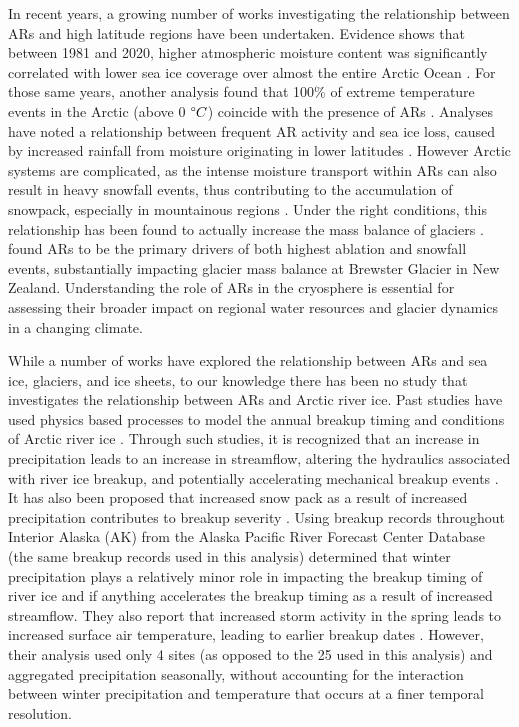 \documentclass[12pts,draft]{AR_analysis_}
\begin{document}
In recent years, a growing number of works 
investigating the relationship between ARs and 
high latitude regions have been undertaken. Evidence shows that between
1981 and 2020, higher atmospheric moisture content was significantly correlated
with lower sea ice coverage over almost the entire Arctic Ocean
\cite{ARs_lead_to_sea_ice_loss}. For those same years, another analysis
found that 100\% of extreme temperature events in the Arctic (above 0
$\degree C$) coincide with the presence of ARs \cite{Ma2023}. Analyses have noted
a relationship between frequent AR activity and sea ice loss, caused by
increased rainfall from moisture originating in lower latitudes
\cite{Zhang2023, maclennan_contribution_2022}. However Arctic systems
are complicated, as the intense moisture transport within ARs can also
result in heavy snowfall events, thus contributing to the accumulation
of snowpack, especially in mountainous regions \cite{Saavedra2020,
Guan2010}. Under the right conditions, this relationship has been found
to actually increase the mass balance of glaciers \cite{Little2019}.
\cite{Little2019} found ARs to be the primary drivers of both highest
ablation and snowfall events, substantially impacting glacier mass
balance at Brewster Glacier in New Zealand. 
Understanding the role of ARs in the cryosphere is essential for
assessing their broader impact on regional water resources and glacier
dynamics in a changing climate. 

While a number of works have explored
the relationship between ARs and sea ice, glaciers, and ice sheets, 
to our knowledge there has
been no study that investigates the relationship between ARs and Arctic
river ice. Past studies have used physics based processes
to model the annual breakup timing and conditions of Arctic river ice
\cite{Paily, ashton1986river, Prowse_Bonsal_Duguay_Lacroix_2007,
jasek1998, shen_newest}. Through such studies, it is recognized that an 
increase in precipitation leads to an increase in
streamflow, altering the hydraulics associated with river ice breakup, and 
potentially accelerating mechanical breakup events \cite{ashton1986river}.
It has also been proposed that increased snow pack as a result of increased 
precipitation contributes to breakup severity \cite{Prowes2002}. Using 
breakup records throughout Interior Alaska (AK) from the Alaska 
Pacific River Forecast Center Database
(the same breakup records used in this analysis)  determined 
that winter precipitation plays a relatively minor role in impacting the 
breakup timing of river ice and if anything accelerates the breakup timing as a 
result of increased streamflow. They also report that 
increased storm activity in the spring leads to increased surface air 
temperature, leading to earlier breakup dates \cite{Bieniek2011}. However, 
their analysis used only 4 sites (as opposed to the 25 used in this analysis) 
and aggregated precipitation seasonally, without accounting for the interaction 
between winter precipitation and temperature that occurs at a finer temporal
resolution. 
\end{document}
